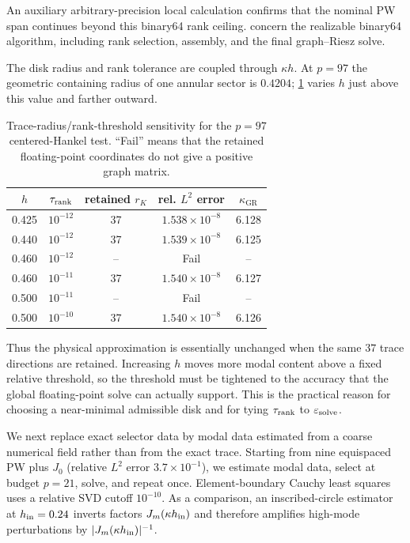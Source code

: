 \documentclass[11pt]{article}
\newcommand{\GR}{\mathrm{GR}}
\numberwithin{equation}{section}
\begin{document}
An auxiliary arbitrary-precision local calculation confirms that the nominal PW span continues beyond this binary64 rank ceiling.   concern the realizable binary64 algorithm, including rank selection, assembly, and the final graph--Riesz solve.

The disk radius and rank tolerance are coupled through $\kappa h$.  At $p=97$ the geometric containing radius of one annular sector is $0.4204$; \cref{tab:radius-sensitivity} varies $h$ just above this value and farther outward.
\begin{table}[htbp]
\centering
\caption{Trace-radius/rank-threshold sensitivity for the $p=97$ centered-Hankel test.  ``Fail'' means that the retained floating-point coordinates do not give a positive graph matrix.}
\label{tab:radius-sensitivity}
\footnotesize
\begin{tabular}{ccccc}
\toprule
$h$ & $\tau_{\rm rank}$ & retained $r_K$ & rel. $L^2$ error & $\kappa_{\GR}$\\
\midrule
0.425 & $10^{-12}$ & 37 & $1.538\times10^{-8}$ & 6.128\\
0.440 & $10^{-12}$ & 37 & $1.539\times10^{-8}$ & 6.125\\
0.460 & $10^{-12}$ & -- & Fail & --\\
0.460 & $10^{-11}$ & 37 & $1.540\times10^{-8}$ & 6.127\\
0.500 & $10^{-11}$ & -- & Fail & --\\
0.500 & $10^{-10}$ & 37 & $1.540\times10^{-8}$ & 6.126\\
\bottomrule
\end{tabular}
\end{table}
Thus the physical approximation is essentially unchanged when the same $37$ trace directions are retained.  Increasing $h$ moves more modal content above a fixed relative threshold, so the threshold must be tightened to the accuracy that the global floating-point solve can actually support.  This is the practical reason for choosing a near-minimal admissible disk and for tying $\tau_{\rm rank}$ to $\varepsilon_{\rm solve}$.

We next replace exact selector data by modal data estimated from a coarse numerical field rather than from the exact trace.  Starting from nine equispaced PW plus $J_0$ (relative $L^2$ error $3.7\times10^{-1}$), we estimate modal data, select at budget $p=21$, solve, and repeat once.  Element-boundary Cauchy least squares uses a relative SVD cutoff $10^{-10}$.  As a comparison, an inscribed-circle estimator at $h_{\rm in}=0.24$ inverts factors $J_m(\kappa h_{\rm in})$ and therefore amplifies high-mode perturbations by $|J_m(\kappa h_{\rm in})|^{-1}$.
\end{document}
